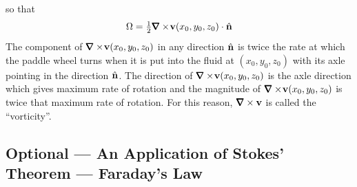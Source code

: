 so that
\begin{equation*}
\Om = \half \vnabla\times\! \vv(x_0,y_0,z_0)\cdot\hn
\end{equation*}
The component of $\vnabla\times\!\vv(x_0,y_0,z_0)$ in any direction 
$\hat{\mathbf{n}}$ is twice the rate at which the paddle wheel turns when it is put 
into the fluid at  $(x_0,y_0,z_0)$ with its axle pointing in the 
direction $\hat{\mathbf{n}}$. The direction
of $\vnabla\times\!\vv(x_0,y_0,z_0)$ is the axle direction which gives
maximum rate of rotation and the magnitude of 
$\vnabla\times\!\vv(x_0,y_0,z_0)$ 
is twice that maximum rate of rotation. For this reason,
$\vnabla\times \vv$ is called the ``vorticity''.



\subsection{Optional --- An Application of Stokes' Theorem --- Faraday's Law}  \label{sec:Faraday}


